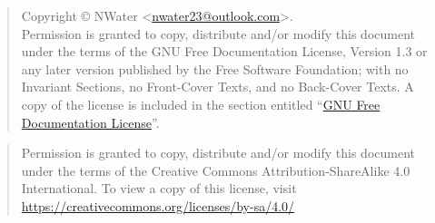 \newpage\thispagestyle{empty}
\begin{quote}\footnotesize
    Copyright \copyright{} {\the\year} NWater <\href{mailto:nwater23@outlook.com}{nwater23@outlook.com}>. \\
    Permission is granted to copy, distribute and/or modify this document
    under the terms of the GNU Free Documentation License, Version 1.3
    or any later version published by the Free Software Foundation;
    with no Invariant Sections, no Front-Cover Texts, and no Back-Cover Texts.
    A copy of the license is included in the section entitled ``\hyperref[label_fdl]{GNU
    Free Documentation License}''.
\end{quote}

\begin{quote}\footnotesize
    Permission is granted to copy, distribute and/or modify this document
    under the terms of the Creative Commons Attribution-ShareAlike 4.0 International. To view a copy of this license, visit \url{https://creativecommons.org/licenses/by-sa/4.0/}
\end{quote}

\endinput